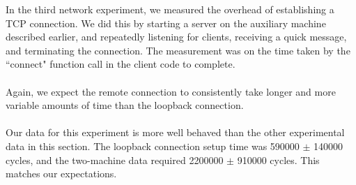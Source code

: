 \noindent In the third network experiment, we measured the overhead of establishing a TCP connection. We did this by starting a server on the auxiliary machine described earlier, and repeatedly listening for clients, receiving a quick message, and terminating the connection. The measurement was on the time taken by the ``connect" function call in the client code to complete.
\\
\\
Again, we expect the remote connection to consistently take longer and more variable amounts of time than the loopback connection. 
\\
\\
Our data for this experiment is more well behaved than the other experimental data in this section. The loopback connection setup time was 590000 $\pm$ 140000 cycles, and the two-machine data required 2200000 $\pm$ 910000 cycles. This matches our expectations.